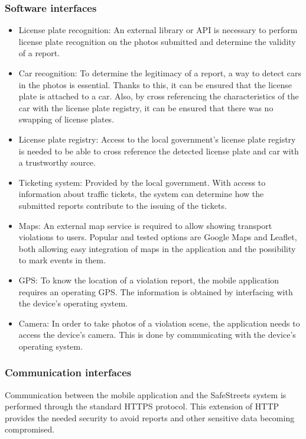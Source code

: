 \subsubsection{Software interfaces}
\begin{itemize}
\item
License plate recognition: An external library or API is necessary to perform license plate recognition on the photos submitted and determine the validity of a report.
\item
Car recognition: To determine the legitimacy of a report, a way to detect cars in the photos is essential. Thanks to this, it can be ensured that the license plate is attached to a car. Also, by cross referencing the characteristics of the car with the license plate registry, it can be ensured that there was no swapping of license plates.
\item
License plate registry: Access to the local government’s license plate registry is needed to be able to cross reference the detected license plate and car with a trustworthy source.
\item
Ticketing system: Provided by the local government. With access to information about traffic tickets, the system can determine how the submitted reports contribute to the issuing of the tickets.
\item
Maps: An external map service is required to allow showing transport violations to users. Popular and tested options are Google Maps and Leaflet, both allowing easy integration of maps in the application and the possibility to mark events in them.
\item
GPS: To know the location of a violation report, the mobile application requires an operating GPS. The information is obtained by interfacing with the device’s operating system.
\item
Camera: In order to take photos of a violation scene, the application needs to access the device’s camera. This is done by communicating with the device’s operating system.
\end{itemize}

\subsubsection{Communication interfaces} \label{sub-sect:communication-interfaces}
Communication between the mobile application and the SafeStreets system is performed through the standard HTTPS protocol. This extension of HTTP provides the needed security to avoid reports and other sensitive data becoming compromised.

